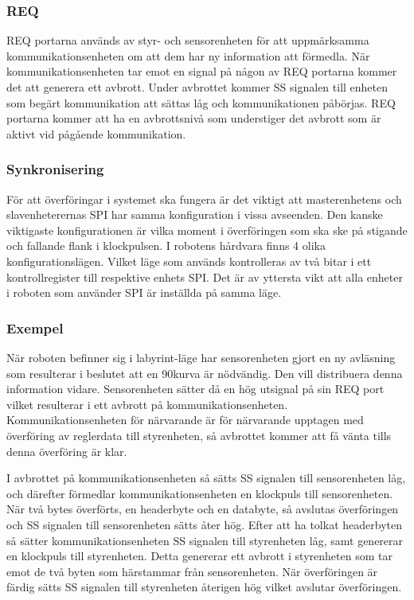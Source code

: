 \subsubsection{REQ}
REQ portarna används av styr- och sensorenheten för att uppmärksamma kommunikationsenheten om att dem har ny information att förmedla. När kommunikationsenheten tar emot en signal på någon av REQ portarna kommer det att generera ett avbrott. Under avbrottet kommer SS signalen till enheten som begärt kommunikation att sättas låg och kommunikationen påbörjas.  REQ portarna kommer att ha en avbrottsnivå som understiger det avbrott som är aktivt vid pågående kommunikation.

\subsubsection{Synkronisering}
För att överföringar i systemet ska fungera är det viktigt att masterenhetens och slavenheterernas SPI har samma konfiguration i vissa avseenden. Den kanske viktigaste konfigurationen är vilka moment i överföringen som ska ske på stigande och fallande flank i klockpulsen. I robotens hårdvara finns 4 olika konfigurationslägen. Vilket läge som används kontrolleras av två bitar i ett kontrollregister till respektive enhets SPI. Det är av yttersta vikt att alla enheter i roboten som använder SPI är inställda på samma läge.

\subsubsection{Exempel}

När roboten befinner sig i labyrint-läge har sensorenheten gjort en ny avläsning som resulterar i beslutet att en 90\degree kurva är nödvändig. Den vill distribuera denna information vidare. Sensorenheten sätter då en hög utsignal på sin REQ port vilket resulterar i ett avbrott på kommunikationsenheten. Kommunikationsenheten för närvarande är för närvarande upptagen med överföring av reglerdata till styrenheten, så avbrottet kommer att få vänta tills denna överföring är klar.

I avbrottet på kommunikationsenheten så sätts SS signalen till sensorenheten låg, och därefter förmedlar kommunikationsenheten en klockpuls till sensorenheten. När två bytes överförts, en headerbyte och en databyte, så avslutas överföringen och SS signalen till sensorenheten sätts åter hög. Efter att ha tolkat headerbyten så sätter kommunikationsenheten SS signalen till styrenheten låg, samt genererar en klockpuls till styrenheten. Detta genererar ett avbrott i styrenheten som tar emot de två byten som härstammar från sensorenheten. När överföringen är färdig sätts SS signalen till styrenheten återigen hög vilket avslutar överföringen. 

